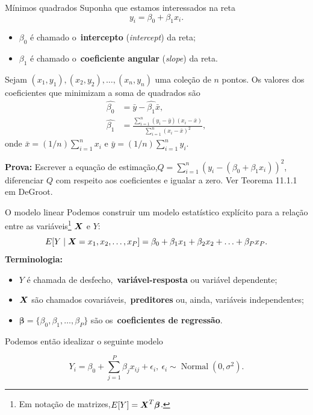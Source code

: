 \begin{frame}{Mínimos quadrados}
Suponha que estamos interessados na reta 
\begin{equation}
 \label{eq:line}
 y_i = \beta_0  + \beta_1x_i.
\end{equation}
\begin{itemize}
 \item $\beta_0$ é chamado o~\textbf{intercepto} (\textit{intercept}) da reta;
 \item $\beta_1$ é chamado o~\textbf{coeficiente angular} (\textit{slope}) da reta.
\end{itemize}

\begin{theo}
\label{thm:least_squares_line}
 Sejam $(x_1, y_1), (x_2, y_2), \ldots, (x_n, y_n)$ uma coleção de $n$ pontos.
 Os valores dos coeficientes que minimizam a soma de quadrados são
 \begin{align*}
  \hat{\beta_0} &= \bar{y} - \hat{\beta_1}\bar{x},\\
  \hat{\beta_1} &= \frac{\sum_{i=1}^n (y_i-\bar{y})(x_i-\bar{x})}{\sum_{i=1}^n \left(x_i - \bar{x}\right)^2},
 \end{align*}
 onde $\bar{x} = (1/n)\sum_{i=1}^n x_i$ e $\bar{y} = (1/n)\sum_{i=1}^n y_i$.
\end{theo}
\textbf{Prova:} Escrever a equação de estimação,$Q = \sum_{i=1}^n \left(y_i - (\beta_0 + \beta_1x_i) \right)^2$, diferenciar $Q$ com respeito aos coeficientes e igualar a zero. 
Ver Teorema 11.1.1 em DeGroot.
\end{frame}

\begin{frame}{O modelo linear}
 Podemos construir um modelo estatístico explícito para a relação entre as variáveis\footnote{Em notação de matrizes,$E[Y] = \boldsymbol{X}^T\boldsymbol{\beta}$.} $\boldsymbol{X}$ e $Y$:
 \begin{equation}
  \label{eq:lin_mod}
  E[Y \mid \boldsymbol{X} = x_1, x_2, \ldots, x_P] = \beta_0 + \beta_1x_1 + \beta_2x_2 + \ldots + \beta_Px_P.  
 \end{equation}
\textbf{Terminologia:}
\begin{itemize}
\item $Y$ é chamada de desfecho,~\textbf{variável-resposta} ou variável dependente;
\item $\boldsymbol{X}$ são chamados covariáveis,~\textbf{preditores} ou, ainda, variáveis independentes;
\item $\boldsymbol{\beta} = \{\beta_0, \beta_1, \ldots, \beta_P\}$ são os~\textbf{coeficientes de regressão}.
\end{itemize}

Podemos então idealizar o seguinte modelo
\begin{ideia}
 \[ Y_i = \beta_0 + \sum_{j=1}^P \beta_jx_{ij} + \epsilon_i,\: \epsilon_i \sim\operatorname{Normal}(0, \sigma^2).\]
\end{ideia}
\end{frame}

